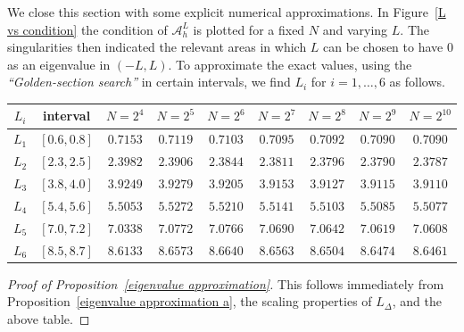 \documentclass[10 pt]{article}
\numberwithin{equation}{section}
\begin{document}
We close this section with some explicit numerical approximations. In Figure~\ref{L vs condition} the condition of $\mathcal{A}^L_h$ is plotted for a fixed $N$ and varying $L$. The singularities then indicated the relevant areas in which $L$ can be chosen to have $0$ as an eigenvalue in $(-L,L)$. To approximate the exact values, using the \textit{``Golden-section search''} in certain intervals, we find $L_i$ for $i=1,\ldots,6$ as follows.

%

\begin{center}
\begin{tabular}{c|c|ccccccc}
$L_i$ & interval & $N=2^4$ & $N=2^5$ & $N=2^6$ & $N=2^7$ & $N=2^8$ & $N=2^9$ & $N=2^{10}$\\
\hline
$L_1$ & $[0.6,0.8]$ & $0.7153$ &$0.7119 $ &$0.7103$ & $0.7095$ & $0.7092$ & $ 0.7090$ &$ 0.7090$\\
$L_2$ & $[2.3,2.5]$ & $2.3982$ &$2.3906$ &$2.3844$ & $2.3811$ &$2.3796$ &$2.3790$&$2.3787$\\
$L_3$ & $[3.8,4.0]$ & $3.9249  $ &$3.9279 $ &$3.9205 $ & $3.9153$ &$3.9127 $ &$3.9115$&$3.9110$\\
$L_4$ & $[5.4,5.6]$ & $5.5053$ &$5.5272 $ &$5.5210$ & $5.5141 $ &$ 5.5103 $ &$5.5085$&$5.5077$\\
$L_5$ & $[7.0,7.2]$ & $7.0338$ &$ 7.0772 $ &$7.0766 $ & $7.0690$ &$ 7.0642  $ &$7.0619$&$7.0608$\\
$L_6$ & $[8.5,8.7]$ & $8.6133$ &$8.6573 $ &$8.6640$ & $8.6563$ &$8.6504$ &$8.6474$&$8.6461$
\end{tabular} 
\end{center}           

\begin{proof}[Proof of Proposition~\ref{eigenvalue approximation}]
This follows immediately from Proposition~\ref{eigenvalue approximation a}, the scaling properties of $L_{\Delta}$, and the above table.
\end{proof}
\end{document}
